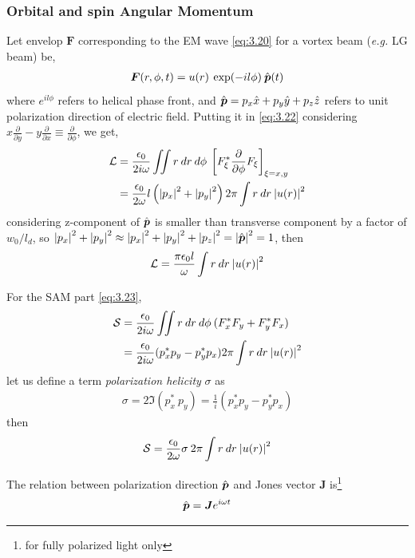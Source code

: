 \documentclass[11pt,a4paper]{article}
\numberwithin{equation}{section}
\begin{document}
\subsubsection{Orbital and spin Angular Momentum}
Let envelop $\boldsymbol{F}$ corresponding to the EM wave \ref{eq:3.20} for a vortex beam (\textit{e.g.} LG beam) be,
\begin{align}
	\boldsymbol{F}(r,\phi,t)= u(r)\:\exp(-il\phi)\:\Hat{\boldsymbol{p}}(t)
\end{align} where $e^{il\phi}$ refers to helical phase front, and $\Hat{\boldsymbol{p}} = p_x\Hat{x}+ p_y\Hat{y}+p_z\Hat{z}$ refers to unit polarization direction of electric field. Putting it in \ref{eq:3.22} considering $x\frac{\partial}{\partial y} - y\frac{\partial}{\partial x} \equiv \frac{\partial}{\partial\phi}$, we get,
\begin{align}
	\mathcal{L}&=\frac{\epsilon_0}{2i\omega} \iint r\:dr\:d\phi\:\left[F_\xi^\ast\frac{\partial}{\partial\phi}F_\xi\right]_{\xi=x,y}\nonumber\\
	&= 	\frac{\epsilon_0}{2\omega} l \left(\abs{p_x}^2+\abs{p_y}^2\right)2\pi \int r\:dr\:\abs{u(r)}^2 \nonumber
\end{align}
considering z-component of $\Hat{\boldsymbol{p}}$ is smaller than transverse component by a factor of $w_0/l_d$, so $\abs{p_x}^2+\abs{p_y}^2 \approx \abs{p_x}^2+\abs{p_y}^2+\abs{p_z}^2 = \abs{\Hat{\boldsymbol{p}}}^2 = 1$, then
\begin{align}
	\mathcal{L}=\frac{\pi\epsilon_0l}{\omega}\int r\:dr\:\abs{u(r)}^2 \label{eq:3.25}
\end{align}

For the SAM part \ref{eq:3.23},
\begin{align}
	\mathcal{S} &= \frac{\epsilon_0}{2i\omega}\iint r\:dr\:d\phi\: (F_x^\ast F_y + F_y^\ast F_x)\nonumber\\
	&=\frac{\epsilon_0}{2i\omega} (p_x^\ast p_y- p_y^\ast p_x)2\pi \int r\:dr\: \abs{u(r)}^2
\end{align}
let us define a term \textit{polarization helicity} $\sigma$ as 
\begin{align}
	\sigma = 2\Im(p_x^\ast\: p_y) = \frac{1}{i} (p_x^\ast p_y- p_y^\ast p_x)
\end{align}
then
\begin{align}
	\mathcal{S}
	=\frac{\epsilon_0}{2\omega}\sigma\: 2\pi \int r\:dr\: \abs{u(r)}^2 \label{eq:3.28}
\end{align}

The relation between polarization direction $\Hat{\boldsymbol{p}}$ and Jones vector $\boldsymbol{J}$ is\footnote{for fully polarized light only} 
	\begin{align}
		\Hat{\boldsymbol{p}} = \boldsymbol{J} e^{i\omega t}
	\end{align}
\end{document}
